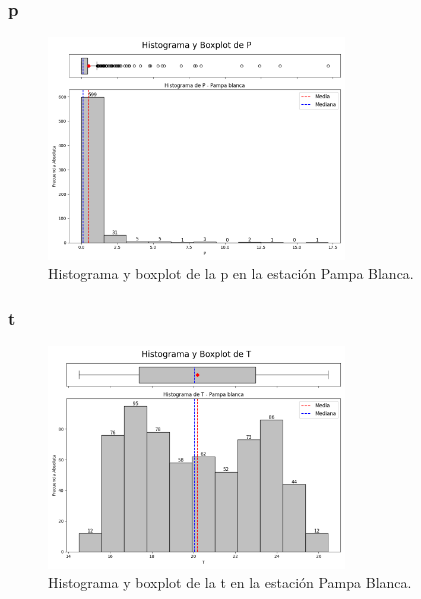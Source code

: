 \subsubsection*{\gls{p} }
\begin{figure}[htbp]
\centering
\includegraphics[width=0.7\textwidth]{resultados/por_estacion_meteorologica/Pampa_Blanca/P_histograma.png}
\caption{Histograma y boxplot de la \gls{p}  en la estación Pampa Blanca.}
\label{fig:pampablanca_P}
\end{figure}

\subsubsection*{\gls{t} }
\begin{figure}[htbp]
\centering
\includegraphics[width=0.7\textwidth]{resultados/por_estacion_meteorologica/Pampa_Blanca/T_histograma.png}
\caption{Histograma y boxplot de la \gls{t}  en la estación Pampa Blanca.}
\label{fig:pampablanca_T}
\end{figure}

